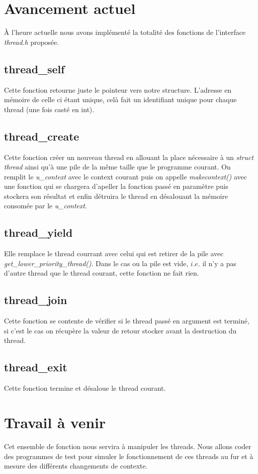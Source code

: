 \section{Avancement actuel}
À l'heure actuelle nous avons implémenté la totalité des fonctions de l'interface \textit{thread.h} proposée. 

\subsection{thread\_self}
Cette fonction retourne juste le pointeur vers notre structure.
L'adresse en mémoire de celle ci étant unique, celà fait un identifiant unique pour chaque thread (une fois casté en int).

\subsection{thread\_create}
Cette fonction créer un nouveau thread en allouant la place nécessaire à un \textit{struct thread} ainsi qu'à une pile de la même taille que le programme courant. On remplit le \textit{u\_context} avec le context courant puis on appelle \textit{makecontext()} avec une fonction qui se chargera d'apeller la fonction passé en paramètre puis stockera son résultat et enfin détruira le thread en désalouant la mémoire consomée par le \textit{u\_context}.

\subsection{thread\_yield}
Elle remplace le thread courrant avec celui qui est retirer de la pile avec \textit{get\_lower\_priority\_thread()}. Dans le cas ou la pile est vide, $i.e.$ il n'y a pas d'autre thread que le thread courant, cette fonction ne fait rien.

\subsection{thread\_join}
Cette fonction se contente de vérifier si le thread passé en argument est terminé, si c'est le cas on récupère la valeur de retour stocker avant la destruction du thread. 


\subsection{thread\_exit}
Cette fonction termine et désaloue le thread courant.

\section{Travail à venir}
Cet ensemble de fonction nous servira à manipuler les threads. Nous allons coder des programmes de test pour simuler le fonctionnement de ces threads au fur et à mesure des différents changements de contexte.
